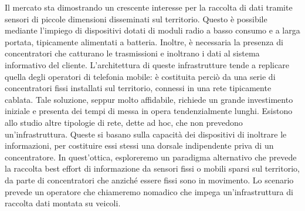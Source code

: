 \documentclass[a4paper,11pt]{article}
\theoremstyle{definition}
\begin{document}
Il mercato sta dimostrando un crescente interesse per la raccolta di dati tramite sensori di piccole dimensioni disseminati sul territorio. Questo è possibile mediante l'impiego di dispositivi dotati di moduli radio a basso consumo e a larga portata, tipicamente alimentati a batteria. Inoltre, è necessaria la presenza di concentratori che catturano le trasmissioni e inoltrano i dati al sistema informativo del cliente. L'architettura di queste infrastrutture tende a replicare quella degli operatori di telefonia mobile: è costituita perciò da una serie di concentratori fissi installati sul territorio, connessi in una rete tipicamente cablata. Tale soluzione, seppur molto affidabile, richiede un grande investimento iniziale e presenta dei tempi di messa in opera tendenzialmente lunghi. Esistono allo studio altre tipologie di rete, dette ad hoc, che non prevedono un'infrastruttura. Queste si basano sulla capacità dei dispositivi di inoltrare le informazioni, per costituire essi stessi una dorsale indipendente priva di un concentratore. In quest'ottica, esploreremo un paradigma alternativo che prevede la raccolta best effort di informazione da sensori fissi o mobili sparsi sul territorio, da parte di concentratori che anziché essere fissi sono in movimento. Lo scenario prevede un operatore che chiameremo nomadico che impega un'infrastruttura di raccolta dati montata su veicoli.




\end{document}
